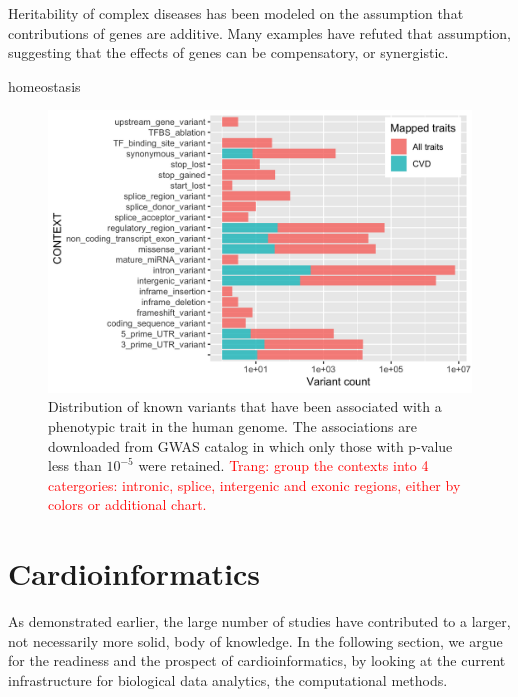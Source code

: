 \documentclass[letter]{bioinfo}
\newcommand{\comment}[1]{\textcolor{red}{#1}}
\begin{document}
Heritability of complex diseases has been modeled on the assumption that contributions of genes are additive. Many examples have refuted that assumption, suggesting that the effects of genes can be compensatory, or synergistic.

homeostasis





\begin{figure}[!tpb]
	\includegraphics[width=1\linewidth]{variant_contexts_sigVars}
	\caption{Distribution of known variants that have been associated with a phenotypic trait in the human genome. The associations are downloaded from GWAS catalog \citep{MacArthur:2017:new} in which only those with p-value less than $10^{-5}$ were retained. \comment{Trang: group the contexts into 4 catergories: intronic, splice, intergenic and exonic regions, either by colors or additional chart.}}
	\label{fig:variant_context}
\end{figure}

%




%
\section{Cardioinformatics}
As demonstrated earlier, the large number of studies have contributed to a larger, not necessarily more solid, body of knowledge. In the following section, we argue for the readiness and the prospect of cardioinformatics, by looking at the current infrastructure for biological data analytics, the computational methods.
\end{document}
